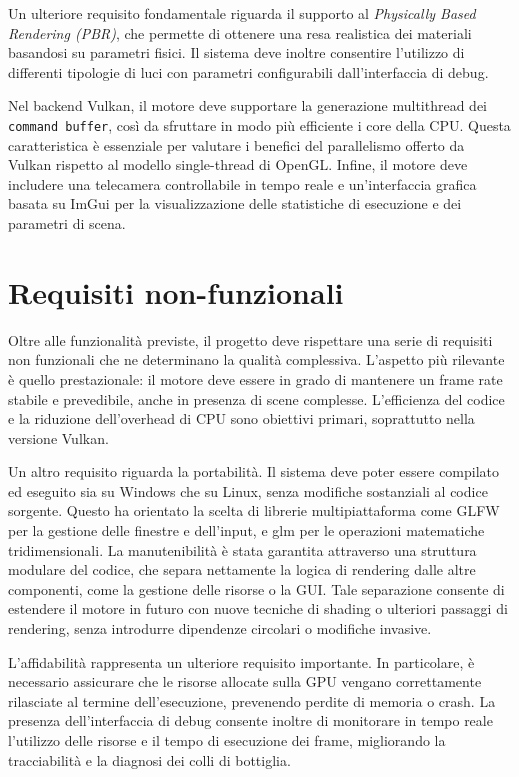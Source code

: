 \documentclass[12pt,a4paper,openright,twoside]{book}
\begin{document}
Un ulteriore requisito fondamentale riguarda il supporto al \emph{Physically Based Rendering (PBR)}, che permette
di ottenere una resa realistica dei materiali basandosi su parametri fisici. Il sistema deve inoltre consentire
l'utilizzo di differenti tipologie di luci con parametri configurabili dall'interfaccia di debug.

Nel backend Vulkan, il motore deve supportare la generazione multithread dei \texttt{command buffer}, così da sfruttare
in modo più efficiente i core della CPU. Questa caratteristica è essenziale per valutare i benefici del parallelismo
offerto da Vulkan rispetto al modello single-thread di OpenGL. Infine, il motore deve includere una telecamera
controllabile in tempo reale e un'interfaccia grafica basata su ImGui per la visualizzazione delle statistiche di
esecuzione e dei parametri di scena.

\section{Requisiti non-funzionali}
Oltre alle funzionalità previste, il progetto deve rispettare una serie di requisiti non funzionali che ne
determinano la qualità complessiva. L'aspetto più rilevante è quello prestazionale: il motore deve essere in grado
di mantenere un frame rate stabile e prevedibile, anche in presenza di scene complesse. L'efficienza del codice e
la riduzione dell'overhead di CPU sono obiettivi primari, soprattutto nella versione Vulkan.

Un altro requisito riguarda la portabilità. Il sistema deve poter essere compilato ed eseguito sia su Windows che su
Linux, senza modifiche sostanziali al codice sorgente. Questo ha orientato la scelta di librerie multipiattaforma
come GLFW per la gestione delle finestre e dell'input, e glm per le operazioni matematiche tridimensionali.
La manutenibilità è stata garantita attraverso una struttura modulare del codice, che separa nettamente la logica di
rendering dalle altre componenti, come la gestione delle risorse o la GUI. Tale separazione consente di estendere il
motore in futuro con nuove tecniche di shading o ulteriori passaggi di rendering, senza introdurre dipendenze
circolari o modifiche invasive.

L'affidabilità rappresenta un ulteriore requisito importante. In particolare, è necessario assicurare che le risorse
allocate sulla GPU vengano correttamente rilasciate al termine dell'esecuzione, prevenendo perdite di memoria o crash.
La presenza dell'interfaccia di debug consente inoltre di monitorare in tempo reale l'utilizzo delle risorse e il
tempo di esecuzione dei frame, migliorando la tracciabilità e la diagnosi dei colli di bottiglia.
\end{document}
